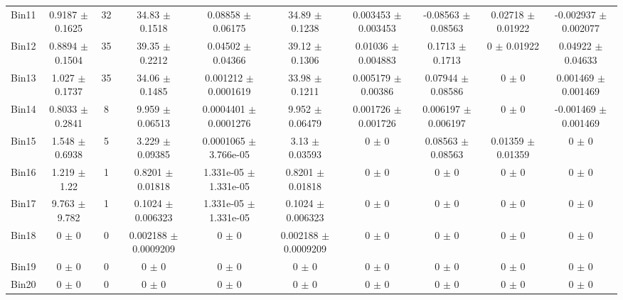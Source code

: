 \begin{tabular}{@{\extracolsep{4pt}}lccccccccc@{}}
     Bin11 & 0.9187 $\pm$ 0.1625 & 32 & 34.83 $\pm$ 0.1518 & 0.08858 $\pm$ 0.06175 & 34.89 $\pm$ 0.1238 & 0.003453 $\pm$ 0.003453 & -0.08563 $\pm$ 0.08563 & 0.02718 $\pm$ 0.01922 & -0.002937 $\pm$ 0.002077 \\ 
     Bin12 & 0.8894 $\pm$ 0.1504 & 35 & 39.35 $\pm$ 0.2212 & 0.04502 $\pm$ 0.04366 & 39.12 $\pm$ 0.1306 & 0.01036 $\pm$ 0.004883 & 0.1713 $\pm$ 0.1713 & 0 $\pm$ 0.01922 & 0.04922 $\pm$ 0.04633 \\ 
     Bin13 & 1.027 $\pm$ 0.1737 & 35 & 34.06 $\pm$ 0.1485 & 0.001212 $\pm$ 0.0001619 & 33.98 $\pm$ 0.1211 & 0.005179 $\pm$ 0.00386 & 0.07944 $\pm$ 0.08586 & 0 $\pm$ 0 & 0.001469 $\pm$ 0.001469 \\ 
     Bin14 & 0.8033 $\pm$ 0.2841 & 8 & 9.959 $\pm$ 0.06513 & 0.0004401 $\pm$ 0.0001276 & 9.952 $\pm$ 0.06479 & 0.001726 $\pm$ 0.001726 & 0.006197 $\pm$ 0.006197 & 0 $\pm$ 0 & -0.001469 $\pm$ 0.001469 \\ 
     Bin15 & 1.548 $\pm$ 0.6938 & 5 & 3.229 $\pm$ 0.09385 & 0.0001065 $\pm$ 3.766e-05 & 3.13 $\pm$ 0.03593 & 0 $\pm$ 0 & 0.08563 $\pm$ 0.08563 & 0.01359 $\pm$ 0.01359 & 0 $\pm$ 0 \\ 
     Bin16 & 1.219 $\pm$ 1.22 & 1 & 0.8201 $\pm$ 0.01818 & 1.331e-05 $\pm$ 1.331e-05 & 0.8201 $\pm$ 0.01818 & 0 $\pm$ 0 & 0 $\pm$ 0 & 0 $\pm$ 0 & 0 $\pm$ 0 \\ 
     Bin17 & 9.763 $\pm$ 9.782 & 1 & 0.1024 $\pm$ 0.006323 & 1.331e-05 $\pm$ 1.331e-05 & 0.1024 $\pm$ 0.006323 & 0 $\pm$ 0 & 0 $\pm$ 0 & 0 $\pm$ 0 & 0 $\pm$ 0 \\ 
     Bin18 & 0 $\pm$ 0 & 0 & 0.002188 $\pm$ 0.0009209 & 0 $\pm$ 0 & 0.002188 $\pm$ 0.0009209 & 0 $\pm$ 0 & 0 $\pm$ 0 & 0 $\pm$ 0 & 0 $\pm$ 0 \\ 
     Bin19 & 0 $\pm$ 0 & 0 & 0 $\pm$ 0 & 0 $\pm$ 0 & 0 $\pm$ 0 & 0 $\pm$ 0 & 0 $\pm$ 0 & 0 $\pm$ 0 & 0 $\pm$ 0 \\ 
     Bin20 & 0 $\pm$ 0 & 0 & 0 $\pm$ 0 & 0 $\pm$ 0 & 0 $\pm$ 0 & 0 $\pm$ 0 & 0 $\pm$ 0 & 0 $\pm$ 0 & 0 $\pm$ 0 \\ 
\hline\hline
  \end{tabular}
